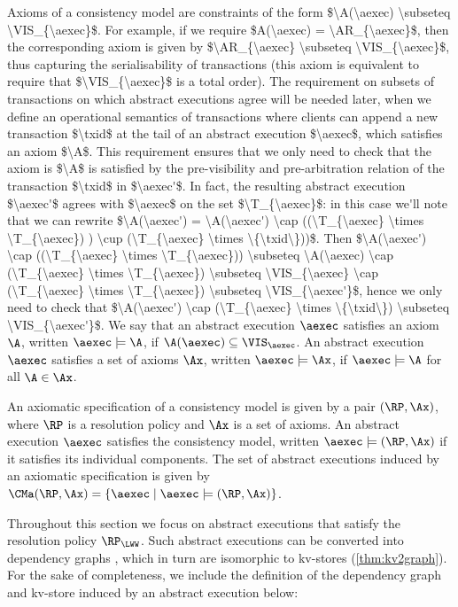 \ac{Axioms of a consistency model are constraints of the form $\A(\aexec) \subseteq \VIS_{\aexec}$. 
For example, if we require $A(\aexec) = \AR_{\aexec}$, then the corresponding axiom is given 
by $\AR_{\aexec} \subseteq \VIS_{\aexec}$, thus capturing the serialisability of transactions 
(this axiom is equivalent to require that $\VIS_{\aexec}$ is a total order). The requirement on 
subsets of transactions on which abstract executions agree will be needed later, when 
we define an operational semantics of transactions where clients can append a new transaction $\txid$ 
at the tail of an abstract execution $\aexec$, which satisfies an axiom $\A$. This requirement ensures that 
we only need to check that the axiom is $\A$ is satisfied by the pre-visibility and pre-arbitration relation 
of the transaction $\txid$ in $\aexec'$. In fact, 
the resulting abstract execution $\aexec'$ agrees with $\aexec$ 
on the set $\T_{\aexec}$: in this case we'll note that we can rewrite 
$\A(\aexec') = \A(\aexec') \cap ((\T_{\aexec} \times \T_{\aexec}) ) \cup (\T_{\aexec} \times \{\txid\}))$. Then
 $\A(\aexec') \cap ((\T_{\aexec} \times \T_{\aexec})) \subseteq \A(\aexec) \cap (\T_{\aexec} \times \T_{\aexec}) 
 \subseteq \VIS_{\aexec} \cap (\T_{\aexec} \times \T_{\aexec}) \subseteq \VIS_{\aexec'}$, 
hence we only need to check that $\A(\aexec') \cap (\T_{\aexec} \times \{\txid\}) \subseteq \VIS_{\aexec'}$.}
We say that an abstract execution $\aexec$ satisfies an axiom $\A$, written 
$\aexec \models \A$, if 
$\A(\aexec) \subseteq \VIS_{\aexec}$. An abstract execution $\aexec$ 
satisfies a set of axioms $\Ax$, written $\aexec \models \Ax$,  if $\aexec \models 
\A$ for all $\A \in \Ax$. 

An axiomatic specification of a consistency model is given by a pair $(\RP, \Ax)$, 
where $\RP$ is a resolution policy and $\Ax$ is a set of axioms. An 
abstract execution $\aexec$ satisfies the consistency model, 
written $\aexec \models (\RP, \Ax)$ if it satisfies its individual components. 
The set of abstract executions induced by an axiomatic specification is given 
by $\CMa(\RP, \Ax) = \{ \aexec \mid \aexec \models (\RP, \Ax)\}$.

Throughout this section we focus on abstract executions that satisfy the 
resolution policy $\RP_{\LWW}$.
Such abstract executions can be converted into dependency graphs \cite{SIanaysis,laws}, 
which in turn are isomorphic to kv-stores (\cref{thm:kv2graph}). For the sake of completeness, 
we include the definition of the dependency graph and kv-store induced by an abstract execution below: 

